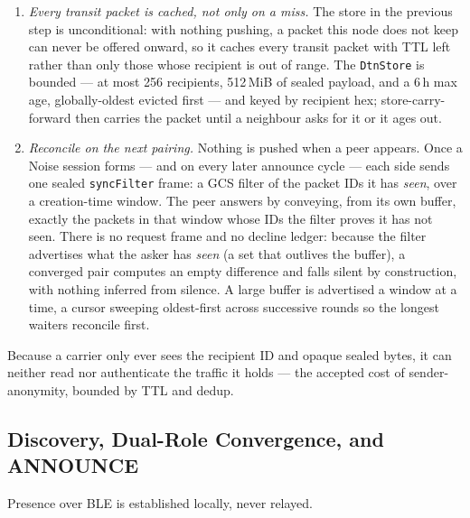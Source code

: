 \documentclass[11pt]{report}
\newcommand{\code}[1]{\texttt{\small #1}}
\begin{document}
\begin{enumerate}
    (\emph{Conveyance over UDX}).
  \item \emph{Every transit packet is cached, not only on a miss.} The store in
    the previous step is unconditional: with nothing pushing, a packet this node
    does not keep can never be offered onward, so it caches every transit packet
    with TTL left rather than only those whose recipient is out of range. The
    \code{DtnStore} is bounded --- at most 256 recipients, 512\,MiB of sealed
    payload, and a 6\,h max age, globally-oldest evicted first --- and keyed by
    recipient hex; store-carry-forward then carries the packet until a neighbour
    asks for it or it ages out.
  \item \emph{Reconcile on the next pairing.} Nothing is pushed when a peer
    appears. Once a Noise session forms --- and on every later announce cycle ---
    each side sends one sealed \code{syncFilter} frame: a GCS filter of the
    packet IDs it has \emph{seen}, over a creation-time window. The peer answers
    by conveying, from its own buffer, exactly the packets in that window whose
    IDs the filter proves it has not seen. There is no request frame and no
    decline ledger: because the filter advertises what the asker has \emph{seen}
    (a set that outlives the buffer), a converged pair computes an empty
    difference and falls silent by construction, with nothing inferred from
    silence. A large buffer is advertised a window at a time, a cursor sweeping
    oldest-first across successive rounds so the longest waiters reconcile first.
\end{enumerate}

Because a carrier only ever sees the recipient ID and opaque sealed bytes, it can
neither read nor authenticate the traffic it holds --- the accepted cost of
sender-anonymity, bounded by TTL and dedup.

\subsection{Discovery, Dual-Role Convergence, and ANNOUNCE}

Presence over BLE is established locally, never relayed.
\end{document}
